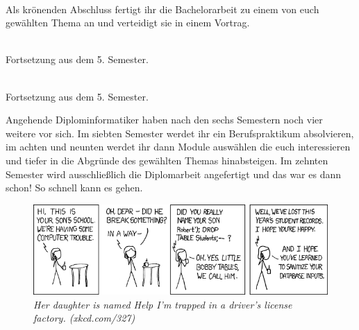 \textbf{} \\
Als krönenden Abschluss fertigt ihr die Bachelorarbeit zu einem von euch gewählten Thema an und verteidigt sie in einem Vortrag.

\textbf{} \\
Fortsetzung aus dem 5. Semester.

\textbf{} \\
Fortsetzung aus dem 5. Semester.


Angehende Diplominformatiker haben nach den sechs Semestern noch vier weitere vor sich.
Im siebten Semester werdet ihr ein Berufspraktikum absolvieren, im achten und neunten werdet ihr dann Module auswählen die euch interessieren und tiefer in die Abgründe des gewählten Themas hinabsteigen.
Im zehnten Semester wird ausschließlich die Diplomarbeit angefertigt und das war es dann schon!
So schnell kann es gehen.

\vfill

\begin{figure}[h!]
\centering
\includegraphics[scale=.5]{img/xkcd/exploits_of_a_mom.png}
\caption*{{\small \textit{Her daughter is named Help I'm trapped in a driver's license factory. (xkcd.com/327)}}}
\end{figure}
